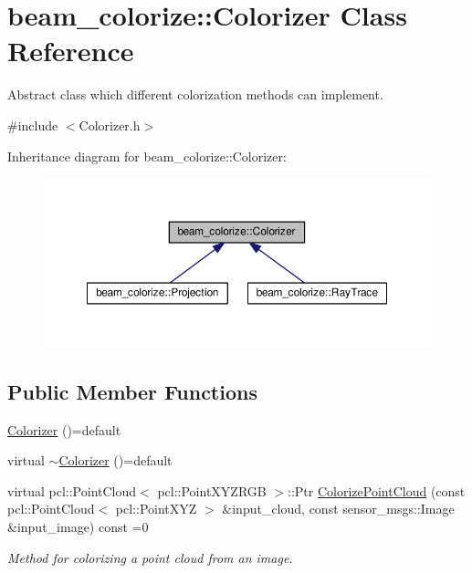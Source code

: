 \hypertarget{classbeam__colorize_1_1_colorizer}{}\section{beam\+\_\+colorize\+:\+:Colorizer Class Reference}
\label{classbeam__colorize_1_1_colorizer}


Abstract class which different colorization methods can implement.  




{\ttfamily \#include $<$Colorizer.\+h$>$}



Inheritance diagram for beam\+\_\+colorize\+:\+:Colorizer\+:\nopagebreak
\begin{figure}[H]
\begin{center}
\leavevmode
\includegraphics[width=350pt]{classbeam__colorize_1_1_colorizer__inherit__graph}
\end{center}
\end{figure}
\subsection*{Public Member Functions}
\begin{DoxyCompactItemize}
\item 
\hyperlink{classbeam__colorize_1_1_colorizer_a47ca25243531c7f55bbc233d8c0c8c47}{Colorizer} ()=default
\item 
virtual \hyperlink{classbeam__colorize_1_1_colorizer_a4fef46e74ca4cac8f9bd2f35f1f4aac9}{$\sim$\+Colorizer} ()=default
\item 
virtual pcl\+::\+Point\+Cloud$<$ pcl\+::\+Point\+X\+Y\+Z\+R\+GB $>$\+::Ptr \hyperlink{classbeam__colorize_1_1_colorizer_ab9ca2ddf55fd8782e6b31c64e85efcbc}{Colorize\+Point\+Cloud} (const pcl\+::\+Point\+Cloud$<$ pcl\+::\+Point\+X\+YZ $>$ \&input\+\_\+cloud, const sensor\+\_\+msgs\+::\+Image \&input\+\_\+image) const =0
\begin{DoxyCompactList}\small\item\em Method for colorizing a point cloud from an image. \end{DoxyCompactList}\end{DoxyCompactItemize}


